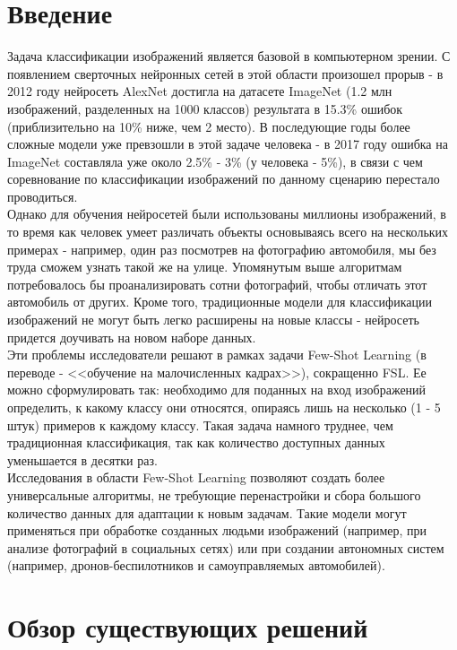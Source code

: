 \documentclass[a4paper, 12pt]{report}
\begin{document}
	\tableofcontents

\chapter{Введение}

Задача классификации изображений является базовой в компьютерном зрении. С появлением сверточных нейронных сетей в этой области произошел прорыв - в 2012 году нейросеть AlexNet достигла на датасете ImageNet (1.2 млн изображений, разделенных на 1000 классов) результата в 15.3\% ошибок (приблизительно на 10\% ниже, чем 2 место). В последующие годы более сложные модели уже превзошли в этой задаче человека - в 2017 году ошибка на ImageNet составляла уже около 2.5\% - 3\% (у человека - 5\%), в связи с чем соревнование по классификации изображений по данному сценарию перестало проводиться. \\

Однако для обучения нейросетей были использованы миллионы изображений, в то время как человек умеет различать объекты основываясь всего на нескольких примерах - например, один раз посмотрев на фотографию автомобиля, мы без труда сможем узнать такой же на улице. Упомянутым выше алгоритмам потребовалось бы проанализировать сотни фотографий, чтобы отличать этот автомобиль от других. Кроме того, традиционные модели для классификации изображений не могут быть легко расширены на новые классы - нейросеть придется доучивать на новом наборе данных. \\

Эти проблемы исследователи решают в рамках задачи Few-Shot Learning (в переводе - <<обучение на малочисленных кадрах>>), сокращенно FSL. Ее можно сформулировать так: необходимо для поданных на вход изображений определить, к какому классу они относятся, опираясь лишь на несколько (1 - 5 штук) примеров к каждому классу. Такая задача намного труднее, чем традиционная классификация, так как количество доступных данных уменьшается в десятки раз. \\

Исследования в области Few-Shot Learning позволяют создать более универсальные алгоритмы, не требующие перенастройки и сбора большого количество данных для адаптации к новым задачам. Такие модели могут применяться при обработке созданных людьми изображений (например, при анализе фотографий в социальных сетях) или при создании автономных систем (например, дронов-беспилотников и самоуправляемых автомобилей).

\chapter{Обзор существующих решений}
\end{document}
